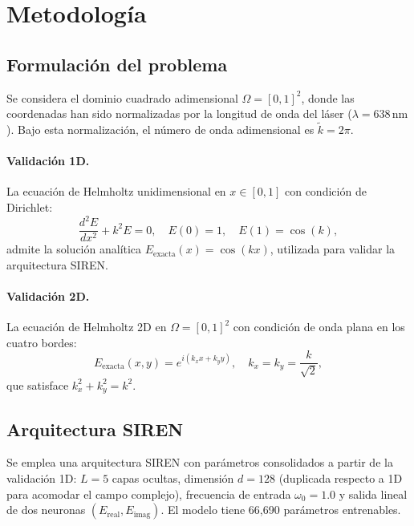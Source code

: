 
\section{Metodología}
\label{sec:metodologia}

\subsection{Formulación del problema}
\label{subsec:formulacion}

Se considera el dominio cuadrado adimensional $\Omega = [0,1]^2$, donde las coordenadas
han sido normalizadas por la longitud de onda del láser ($\lambda = 638\,\mathrm{nm}$).
Bajo esta normalización, el número de onda adimensional es $\tilde{k} = 2\pi$.

\paragraph{Validación 1D.}
La ecuación de Helmholtz unidimensional en $x \in [0,1]$ con condición de Dirichlet:
%
\begin{equation}
  \frac{d^2 E}{dx^2} + k^2 E = 0, \quad E(0) = 1, \quad E(1) = \cos(k),
  \label{eq:helmholtz1d}
\end{equation}
%
admite la solución analítica $E_{\mathrm{exacta}}(x) = \cos(kx)$, utilizada para
validar la arquitectura SIREN.

\paragraph{Validación 2D.}
La ecuación de Helmholtz 2D en $\Omega = [0,1]^2$ con condición de onda plana en los
cuatro bordes:
%
\begin{equation}
  E_{\mathrm{exacta}}(x,y) = e^{i(k_x x + k_y y)}, \quad k_x = k_y = \frac{k}{\sqrt{2}},
  \label{eq:solucion2d}
\end{equation}
%
que satisface $k_x^2 + k_y^2 = k^2$.

\subsection{Arquitectura SIREN}
\label{subsec:arquitectura}

Se emplea una arquitectura SIREN con parámetros consolidados a partir de la validación 1D:
$L = 5$ capas ocultas, dimensión $d = 128$ (duplicada respecto a 1D para acomodar el
campo complejo), frecuencia de entrada $\omega_0 = 1.0$ y salida lineal de dos
neuronas $(E_{\mathrm{real}}, E_{\mathrm{imag}})$.
El modelo tiene 66{,}690 parámetros entrenables.

